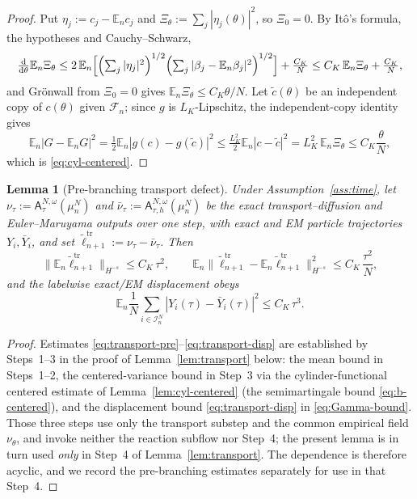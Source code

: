 \documentclass[a4paper,fleqn]{cas-sc}
\newtheorem{lemma}[theorem]{Lemma}
\theoremstyle{definition}
\theoremstyle{remark}
\begin{document}
\begin{proof}
Put $\eta_j:=c_j-\mathbb E_nc_j$ and $\Xi_\theta:=\sum_j|\eta_j(\theta)|^2$, so $\Xi_0=0$. By
It\^o's formula, the hypotheses and Cauchy--Schwarz,
\[
\tfrac{\mathrm d}{\mathrm d\theta}\mathbb E_n\Xi_\theta
\le2\,\mathbb E_n\Bigl[\Bigl(\textstyle\sum_j|\eta_j|^2\Bigr)^{1/2}\Bigl(\textstyle\sum_j|\beta_j-\mathbb E_n\beta_j|^2\Bigr)^{1/2}\Bigr]
+\frac{C_K}N
\le C_K\,\mathbb E_n\Xi_\theta+\frac{C_K}N,
\]
and Gr\"onwall from $\Xi_0=0$ gives $\mathbb E_n\Xi_\theta\le C_K\theta/N$. Let
$\widetilde c(\theta)$ be an independent copy of $c(\theta)$ given $\mathcal F_n$; since $g$ is
$L_K$-Lipschitz, the independent-copy identity gives
\[
\mathbb E_n|G-\mathbb E_nG|^2
=\tfrac12\mathbb E_n|g(c)-g(\widetilde c)|^2
\le\tfrac{L_K^2}2\mathbb E_n|c-\widetilde c|^2
=L_K^2\,\mathbb E_n\Xi_\theta\le C_K\frac\theta N,
\]
which is \eqref{eq:cyl-centered}.
\end{proof}

\begin{lemma}[Pre-branching transport defect]\label{lem:transport-pre}
Under Assumption~\ref{ass:time}, let
$\nu_\tau:=\mathsf A^{N,\omega}_\tau(\mu^N_n)$ and
$\bar\nu_\tau:=\mathsf A^{N,\omega}_{\tau,h}(\mu^N_n)$ be the exact transport--diffusion
and Euler--Maruyama outputs over one step, with exact and EM particle trajectories
$Y_i,\bar Y_i$, and set $\widetilde\ell^{\mathrm{tr}}_{n+1}:=\nu_\tau-\bar\nu_\tau$.
Then
\begin{equation}\label{eq:transport-pre}
\|\mathbb E_n\widetilde\ell^{\mathrm{tr}}_{n+1}\|_{H^{-s}}\le C_K\,\tau^2,
\qquad
\mathbb E_n\|\widetilde\ell^{\mathrm{tr}}_{n+1}-\mathbb E_n\widetilde\ell^{\mathrm{tr}}_{n+1}\|_{H^{-s}}^2
\le C_K\,\frac{\tau^2}{N},
\end{equation}
and the labelwise exact/EM displacement obeys
\begin{equation}\label{eq:transport-disp}
\mathbb E_n\frac1N\sum_{i\in\mathcal I^N_n}|Y_i(\tau)-\bar Y_i(\tau)|^2\le C_K\,\tau^3 .
\end{equation}
\end{lemma}

\begin{proof}
Estimates \eqref{eq:transport-pre}--\eqref{eq:transport-disp} are established by
Steps~1--3 in the proof of Lemma~\ref{lem:transport} below: the mean bound in
Steps~1--2, the centered-variance bound in Step~3 via the cylinder-functional
centered estimate of Lemma~\ref{lem:cyl-centered} (the semimartingale bound
\eqref{eq:b-centered}), and the displacement bound \eqref{eq:transport-disp} in
\eqref{eq:Gamma-bound}. Those three steps use only the transport substep and the
common empirical field $\nu_\theta$, and invoke neither the reaction subflow nor
Step~4; the present lemma is in turn used \emph{only} in Step~4 of
Lemma~\ref{lem:transport}. The dependence is therefore acyclic, and we record the
pre-branching estimates separately for use in that Step~4.
\end{proof}
\end{document}
